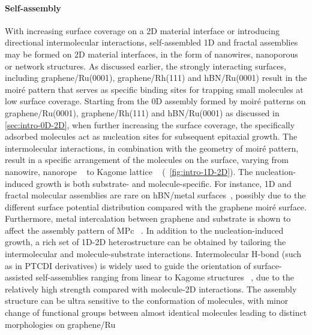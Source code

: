 \paragraph{Self-assembly}

With increasing surface coverage on a 2D material interface or
introducing directional intermolecular interactions, self-assembled 1D
and fractal assemblies may be formed on 2D material interfaces, in the
form of nanowires, nanoporous or network structures.
%
As discussed earlier, the strongly interacting surfaces, including
graphene/\allowbreak{}Ru(0001), graphene/Rh(111) and hBN/Ru(0001)
result in the moiré pattern that serves as specific binding sites for
trapping small molecules at low surface coverage.  Starting from the
0D assembly formed by moiré patterns on
graphene/\allowbreak{}Ru(0001), graphene/Rh(111) and hBN/Ru(0001) as
discussed in \autoref{sec:intro-0D-2D}, when further increasing the
surface coverage, the specifically adsorbed molecules act as
nucleation sites for subsequent epitaxial growth.  The intermolecular
interactions, in combination with the geometry of moiré pattern,
result in a specific arrangement of the molecules on the surface,
varying from nanowire, nanorope ~\autocite{Maccariello_2014_TCNQ_gr_Ru} to
Kagome lattice ~\autocite{Atwood_2002_kagome,Mao_2009_Pc_gr_kagome}
(~\autoref{fig:intro-1D-2D}).
%
The nucleation-induced growth is both substrate- and
molecule-specific. For instance, 1D and fractal molecular assemblies
are rare on hBN/metal
surfaces~\autocite{Schulz_2013_copc_hbn_moire,Schulz_2014_hBN_moire,Iannuzzi_2014_MPc_hBN_Rh,Joshi_2014_TCNQ_hBN},
possibly due to the different surface potential distribution compared
with the graphene moiré surface. Furthermore, metal intercalation
between graphene and substrate is shown to affect the assembly pattern
of MPc
~\autocite{Bazarnik_2013_tailor_Fe_Co_gr_Ir,Avvisati_2017_FePc_intercal}.
%
In addition to the nucleation-induced growth, a rich set of 1D-2D
heterostructure can be obtained by tailoring the intermolecular and
molecule-substrate interactions.
%
Intermolecular H-bond (such as in PTCDI derivatives) is widely used to
guide the orientation of surface-assisted self-assemblies ranging from
linear to Kagome structures ~\autocite{Slater_2014_HBond_assembl_rev,
  Pollard_2010_hbond_assembly_gr, }, due to the relatively high
strength compared with molecule-2D interactions.
%
The assembly structure can be ultra sensitive to the conformation of
molecules, with minor change of functional groups between almost
identical molecules leading to distinct morphologies on graphene/\allowbreak{}Ru
